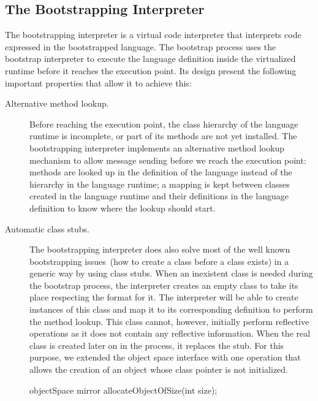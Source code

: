 \subsection{The Bootstrapping Interpreter}\label{sec:ast_interpreter}

The bootstrapping interpreter is a virtual code interpreter that interprets code expressed in the bootstrapped language. The bootstrap process uses the bootstrap interpreter to execute the language definition inside the virtualized runtime before it reaches the execution point. Its design present the following important properties that allow it to achieve this:

\begin{description}
\item[Alternative method lookup.] Before reaching the execution point, the class hierarchy of the language runtime is incomplete, or part of its methods are not yet installed. The bootstrapping interpreter implements an alternative method lookup mechanism to allow message sending before we reach the execution point: methods are looked up in the definition of the language instead of the hierarchy in the language runtime; a mapping is kept between classes created in the language runtime and their definitions in the language definition to know where the lookup should start.

\item[Automatic class stubs.] The bootstrapping interpreter does also solve most of the well known bootstrapping issues~(\eg how to create a class before a class exists) in a generic way by using class stubs. When an inexistent class is needed during the bootstrap process, the interpreter creates an empty class to take its place respecting the \VM format for it. The interpreter will be able to create instances of this class and map it to its corresponding definition to perform the method lookup. This class cannot, however, initially perform reflective operations as it does not contain any reflective information. When the real class is created later on in the process, it replaces the stub. For this purpose, we extended the object space interface with one operation that allows the creation of an object whose class pointer is not initialized.

\begin{code}
objectSpace {
    mirror allocateObjectOfSize(int size);
}
\end{code}

\end{description}

